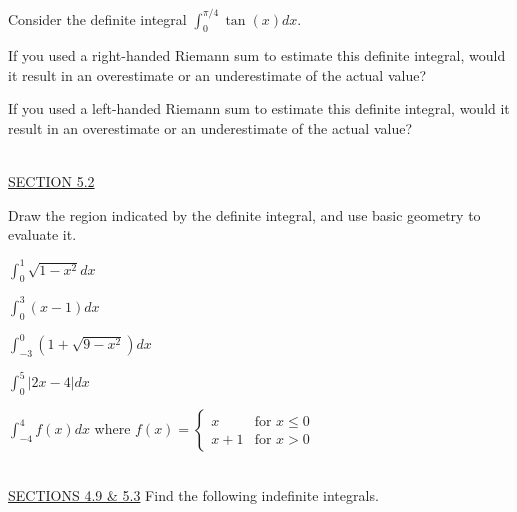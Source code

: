 \documentclass{exam}
\begin{document}
\begin{questions}
\question Consider the definite integral $\displaystyle\int_0^{\pi/4} \tan(x)dx$.
  \begin{parts}
  \item If you used a right-handed Riemann sum to estimate this definite integral, would it result in an overestimate or an underestimate of the actual value? %
  \item If you used a left-handed Riemann sum to estimate this definite integral, would it result in an overestimate or an underestimate of the actual value? %
  \end{parts}
  
  \newpage\thispagestyle{empty}

\ \\
\underline{SECTION 5.2}

\question Draw the region indicated by the definite integral, and use basic geometry to evaluate it.
  \begin{parts}
  \begin{multicols}{2}
  \item $\displaystyle\int_0^1 \sqrt{1-x^2}dx$ %
  \item $\displaystyle\int_0^3 (x-1)dx$ %
  \item $\displaystyle\int_{-3}^0\left( 1+\sqrt{9-x^2}\right)dx$ %
    \item $\displaystyle\int_{0}^5 \left| 2x - 4 \right| dx$ %
  \item $\displaystyle\int_{-4}^4 f(x)dx$ where $f(x) = \left\{ \begin{array}{ll}x & \mbox{for $x\leq 0$}\\
  x+1& \mbox{for $x>0$}\end{array} \right.$ %
  \end{multicols}
  \end{parts}
  

\ \\
\underline{SECTIONS 4.9 \& 5.3}
\question Find the following indefinite integrals.
  \begin{parts}
  \begin{multicols}{2}

\end{multicols}
\end{parts}
\end{questions}
\end{document}

